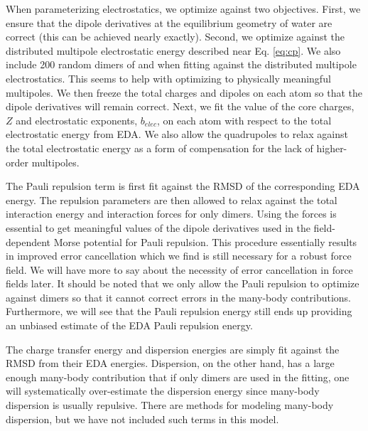 \documentclass[journal=jctcce,manuscript=article]{achemso}
\begin{document}
When parameterizing electrostatics, we optimize against two objectives. First, we ensure that the dipole derivatives at the equilibrium geometry of water are correct (this can be achieved nearly exactly). Second, we optimize against the distributed multipole electrostatic energy described near Eq. \ref{eq:cp}. We also include 200 random dimers of  and  when fitting against the distributed multipole electrostatics. This seems to help with optimizing to physically meaningful multipoles. We then freeze the total charges and dipoles on each atom so that the dipole derivatives will remain correct. Next, we fit the value of the core charges, $Z$ and electrostatic exponents, $b_{elec}$, on each atom with respect to the total electrostatic energy from EDA. We also allow the quadrupoles to relax against the total electrostatic energy as a form of compensation for the lack of higher-order multipoles.

The Pauli repulsion term is first fit against the RMSD of the corresponding EDA energy. The repulsion parameters are then allowed to relax against the total interaction energy and interaction forces for only dimers. Using the forces is essential to get meaningful values of the dipole derivatives used in the field-dependent Morse potential for Pauli repulsion. This procedure essentially results in improved error cancellation which we find is still necessary for a robust force field. We will have more to say about the necessity of error cancellation in force fields later. It should be noted that we only allow the Pauli repulsion to optimize against dimers so that it cannot correct errors in the many-body contributions. Furthermore, we will see that the Pauli repulsion energy still ends up providing an unbiased estimate of the EDA Pauli repulsion energy.

The charge transfer energy and dispersion energies are simply fit against the RMSD from their EDA energies. Dispersion, on the other hand, has a large enough many-body contribution that if only dimers are used in the fitting, one will systematically over-estimate the dispersion energy since many-body dispersion is usually repulsive. There are methods for modeling many-body dispersion, but we have not included such terms in this model.\cite{anatole2010two,van2018new} 
\end{document}
